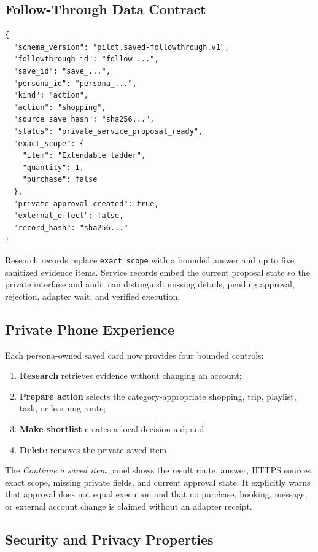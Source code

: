 \subsection{Follow-Through Data Contract}

\begin{verbatim}
{
  "schema_version": "pilot.saved-followthrough.v1",
  "followthrough_id": "follow_...",
  "save_id": "save_...",
  "persona_id": "persona_...",
  "kind": "action",
  "action": "shopping",
  "source_save_hash": "sha256...",
  "status": "private_service_proposal_ready",
  "exact_scope": {
    "item": "Extendable ladder",
    "quantity": 1,
    "purchase": false
  },
  "private_approval_created": true,
  "external_effect": false,
  "record_hash": "sha256..."
}
\end{verbatim}

Research records replace \texttt{exact\_scope} with a bounded answer and up to
five sanitized evidence items.  Service records embed the current proposal state
so the private interface and audit can distinguish missing details, pending
approval, rejection, adapter wait, and verified execution.

\subsection{Private Phone Experience}

Each persona-owned saved card now provides four bounded controls:

\begin{enumerate}
    \item \textbf{Research} retrieves evidence without changing an account;
    \item \textbf{Prepare action} selects the category-appropriate shopping,
    trip, playlist, task, or learning route;
    \item \textbf{Make shortlist} creates a local decision aid; and
    \item \textbf{Delete} removes the private saved item.
\end{enumerate}

The \emph{Continue a saved item} panel shows the result route, answer, HTTPS
sources, exact scope, missing private fields, and current approval state.  It
explicitly warns that approval does not equal execution and that no purchase,
booking, message, or external account change is claimed without an adapter
receipt.

\subsection{Security and Privacy Properties}


